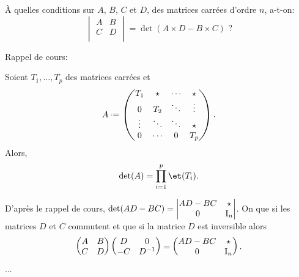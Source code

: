 \begin{exercice} 
À quelles conditions sur $A$, $B$, $C$ et $D$, des matrices carrées d'ordre $n$, a-t-on:
    $$
        \begin{vmatrix}
            A & B\\
            C & D\\
        \end{vmatrix} = \det(A \times D - B \times C) \text{ ?}
    $$ 
\end{exercice}
 
Rappel de cours:

\begin{prop}
    Soient $T_1, \dots, T_p$ des matrices carrées et 
    $$A \defeq
    \begin{pmatrix}
        T_1 & \star & \cdots & \star \\
        0 & T_2 & \ddots & \vdots \\
        \vdots & \ddots & \ddots & \star \\
        0 & \cdots & 0 & T_p
    \end{pmatrix}.
    $$
    Alors, 
    $$\det(A) = \prod_{i=1}^p \et(T_i).$$
\end{prop}

\begin{solution}
    D'après le rappel de cours, $\det(AD - BC) = \begin{vmatrix}
        AD - BC & \star \\
        0 & \mathrm{I}_n
    \end{vmatrix}$.  
    On  que si les matrices $D$ et $C$ commutent et que si la matrice $D$ est inversible alors
    $$
    \begin{pmatrix}
        A & B \\
        C & D
    \end{pmatrix}
    \begin{pmatrix}
        D & 0 \\
        -C & D^{-1}
    \end{pmatrix}
     = \begin{pmatrix}
         AD-BC & \star \\
         0 & \mathrm{I}_n
     \end{pmatrix}.
    $$
    ...
\end{solution}